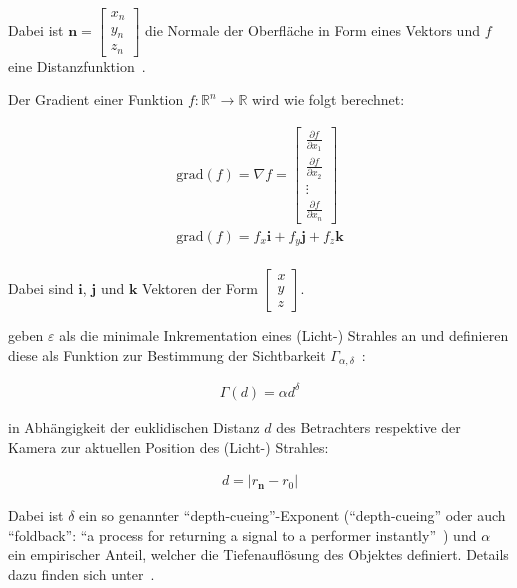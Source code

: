 Dabei ist $\bm{n} = \begin{bmatrix} x_{n} \\ y_{n} \\ z_{n} \end{bmatrix}$
die Normale der Oberfläche in Form eines Vektors und $f$ eine
Distanzfunktion~\parencites[S. 292 bis 293]{hart_ray_1989}[S.
13]{hart_ray_1993}.

Der Gradient einer Funktion $f: \mathbb{R}^{n} \to \mathbb{R}$ wird wie
folgt berechnet:

\begin{gather}
    \text{grad}(f) = \nabla f = \begin{bmatrix}
        \frac{\partial f}{\partial x_{1}} \\
        \frac{\partial f}{\partial x_{2}} \\
        \vdots \\
        \frac{\partial f}{\partial x_{n}} 
    \end{bmatrix}\\
    \text{grad}(f) = f_{x}\bm{i} + f_{y}\bm{j} + f_{z}\bm{k}\\
\end{gather}

Dabei sind $\bm{i}$, $\bm{j}$ und $\bm{k}$ Vektoren der Form $\begin{bmatrix}
    x \\ y \\ z \end{bmatrix}$.

\citeauthor{hart_ray_1989} geben $\varepsilon$ als die minimale
Inkrementation eines (Licht-) Strahles an und definieren diese als
Funktion zur Bestimmung der Sichtbarkeit $\Gamma_{\alpha,
    \delta}$~\parencite[S. 293]{hart_ray_1989}:

\begin{gather}
    \Gamma(d) = \alpha d^{\delta}
\end{gather}

in Abhängigkeit der euklidischen Distanz $d$ des Betrachters respektive
der Kamera zur aktuellen Position des (Licht-) Strahles:

\begin{gather}
    d = |r_{\bm{n}} - r_{0}|
\end{gather}

Dabei ist $\delta$ ein so genannter ``depth-cueing''-Exponent
(``depth-cueing'' oder auch ``foldback'': ``a process for returning a
signal to a performer
instantly''~\parencite{liam_collins_sons_&_co._ltd._collins_2015}) und
$\alpha$ ein empirischer Anteil, welcher die Tiefenauflösung des
Objektes definiert.  Details dazu finden sich
unter~\cite[S. 293, Abschnitt 4.2 --- ``Clarity'']{hart_ray_1989}.

